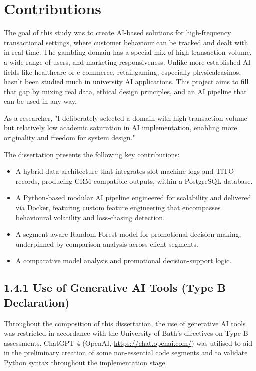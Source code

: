 \documentclass[12pt,a4paper]{report}
\begin{document}
\section{Contributions}

The goal of this study was to create AI-based solutions for high-frequency transactional settings, where customer behaviour can be tracked and dealt with in real time.  The gambling domain has a special mix of high transaction volume, a wide range of users, and marketing responsiveness.  Unlike more established AI fields like healthcare or e-commerce, retail,gaming, especially physicalcasinos, hasn't been studied much in university AI applications.  This project aims to fill that gap by mixing real data, ethical design principles, and an AI pipeline that can be used in any way.

As a researcher, "I deliberately selected a domain with high transaction volume but relatively low academic saturation in AI implementation, enabling more originality and freedom for system design."

The dissertation presents the following key contributions:

\begin{itemize}
    \item A hybrid data architecture that integrates slot machine logs and TITO records, producing CRM-compatible outputs, within a PostgreSQL database.
    \item A Python-based modular AI pipeline engineered for scalability and delivered via Docker, featuring custom feature engineering that encompasses behavioural volatility and loss-chasing detection.
    \item A segment-aware Random Forest model for promotional decision-making, underpinned by comparison analysis across client segments.
    \item A comparative model analysis and promotional decision-support logic.
\end{itemize}

\subsection*{1.4.1 Use of Generative AI Tools (Type B Declaration)}

Throughout the composition of this dissertation, the use of generative AI tools was restricted in accordance with the University of Bath's directives on Type B assessments. ChatGPT-4 (OpenAI, \url{https://chat.openai.com/}) was utilised to aid in the preliminary creation of some non-essential code segments and to validate Python syntax throughout the implementation stage.
\end{document}
